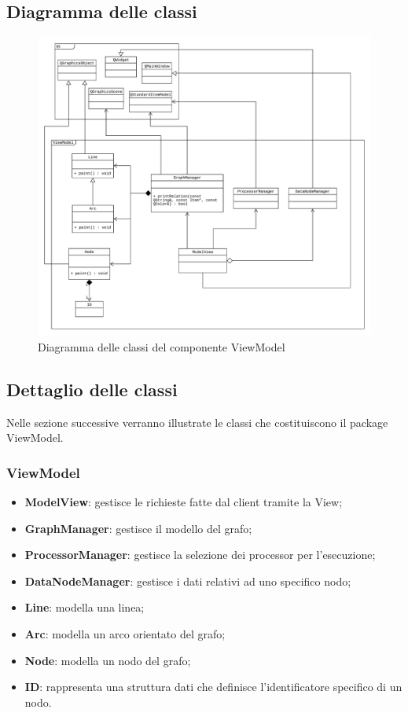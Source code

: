 \documentclass[openany,12pt,a4paper]{report}
\begin{document}
\subsection{Diagramma delle classi}

\begin{figure}[H]
	\includegraphics[scale=0.5]{ViewModelDiagram}
	\centering
	\caption{Diagramma delle classi del componente ViewModel}
\end{figure}

\subsection{Dettaglio delle classi}

Nelle sezione successive verranno illustrate le classi che costituiscono il package ViewModel.

\subsubsection{ViewModel}

\begin{itemize}
	\item \textbf{ModelView}: gestisce le richieste fatte dal client tramite la View;
	\item \textbf{GraphManager}: gestisce il modello del grafo;
	\item \textbf{ProcessorManager}: gestisce la selezione dei processor per l'esecuzione;
	\item \textbf{DataNodeManager}: gestisce i dati relativi ad uno specifico nodo;
	\item \textbf{Line}: modella una linea;
	\item \textbf{Arc}: modella un arco orientato del grafo;
	\item \textbf{Node}: modella un nodo del grafo;
	\item \textbf{ID}:  rappresenta una struttura dati che definisce l'identificatore specifico di un nodo.
\end{itemize}
\end{document}
